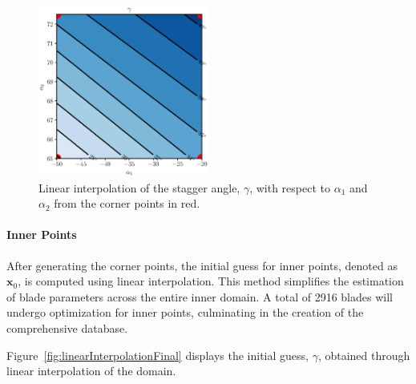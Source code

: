 \documentclass[11pt,a4paper,twocolumn]{article}
\begin{document}
\begin{figure}[!h]
    \centering
    \includegraphics[width=0.5\textwidth]{./images/staggerLinear.eps}
    \caption{Linear interpolation of the stagger angle, $\gamma$, with respect to $\alpha_1$ and $\alpha_2$ from the corner points in red.}
    \label{fig:linearInterpolation}
\end{figure}

\paragraph{Inner Points}


After generating the corner points, the initial guess for inner points, denoted as $\boldsymbol{x}_0$, is computed using linear interpolation. This method simplifies the estimation of blade parameters across the entire inner domain. A total of 2916 blades will undergo optimization for inner points, culminating in the creation of the comprehensive database.

Figure~\ref{fig:linearInterpolationFinal} displays the initial guess, $\gamma$, obtained through linear interpolation of the domain.
\end{document}
